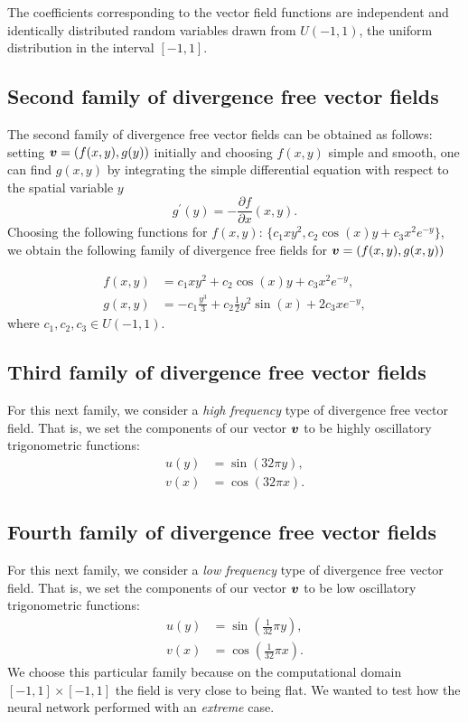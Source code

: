 The coefficients corresponding to the vector field functions 
are independent and identically distributed random variables 
drawn from $U(-1,1)$, the uniform distribution in the interval $[-1,1]$.

\subsection{Second family of divergence free vector fields}

The second family of divergence free vector fields can be obtained as follows: setting ${\boldsymbol v} = \left(f(x,y),g(y)\right)$ initially and choosing $f(x,y)$ simple and smooth, one can find $g(x,y)$ by integrating the simple differential equation with respect to the spatial variable $y$
\[g^{'}(y) = -\frac{\partial f}{\partial x}(x,y). 
\]
Choosing the following functions for $f(x,y)$: $\{c_1 x y^2, c_2 \cos(x) y + c_3 x^2 e^{-y}\}$, we obtain the following family of divergence free fields for ${\boldsymbol v} = \left(f(x,y),g(x,y)\right)$

\begin{align}
    f(x,y) &= c_1 x y^2 +  c_2 \cos(x) y + c_3 x^2 e^{-y},\label{secondClassVX}\\
    g(x,y) &= -c_1\frac{y^3}{3} + c_2 \frac{1}{2}y^2\sin(x) + 2c_3xe^{-y},\label{secondClassVY}
\end{align}
where $c_1,c_2,c_3\in U(-1,1)$.
\subsection{Third family of divergence free vector fields}
For this next family, we consider a \textit{high frequency} type of divergence free vector field. That is, we set the components of our vector ${\boldsymbol v}$ to be highly oscillatory trigonometric functions: 
\begin{align}
    u(y) &= \sin(32\pi y),\label{thirdClassVX}\\
    v(x) &= \cos(32\pi x).\label{thirdClassVY}
\end{align}
\subsection{Fourth family of divergence free vector fields}
For this next family, we consider a \textit{low frequency} type of divergence free vector field. That is, we set the components of our vector ${\boldsymbol v}$ to be low oscillatory trigonometric functions: 
\begin{align}
    u(y) &= \sin(\frac{1}{32}\pi y),\label{fourthClassVX}\\
    v(x) &= \cos(\frac{1}{32}\pi x).\label{fourthClassVY}
\end{align}
We choose this particular family because on the computational domain $[-1,1] \times [-1,1]$ the field is very close to being flat. We wanted to test how the neural network performed with an \textit{extreme} case. 

